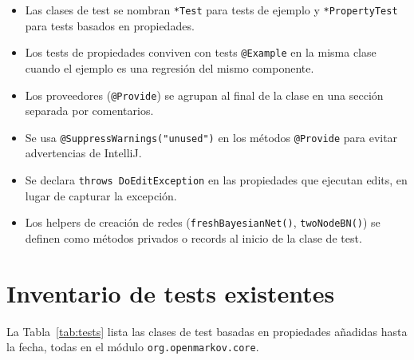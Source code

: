 \documentclass[12pt,a4paper]{article}
\begin{document}
\begin{itemize}
  \item Las clases de test se nombran \texttt{*Test} para tests de ejemplo
    y \texttt{*PropertyTest} para tests basados en propiedades.
  \item Los tests de propiedades conviven con tests \texttt{@Example} en la
    misma clase cuando el ejemplo es una regresión del mismo componente.
  \item Los proveedores (\texttt{@Provide}) se agrupan al final de la clase
    en una sección separada por comentarios.
  \item Se usa \texttt{@SuppressWarnings("unused")} en los métodos
    \texttt{@Provide} para evitar advertencias de IntelliJ.
  \item Se declara \texttt{throws DoEditException} en las propiedades que
    ejecutan edits, en lugar de capturar la excepción.
  \item Los helpers de creación de redes (\texttt{freshBayesianNet()},
    \texttt{twoNodeBN()}) se definen como métodos privados o records
    al inicio de la clase de test.
\end{itemize}

\section{Inventario de tests existentes}
\label{sec:inventario}

La Tabla~\ref{tab:tests} lista las clases de test basadas en propiedades
añadidas hasta la fecha, todas en el módulo \texttt{org.openmarkov.core}.
\end{document}
